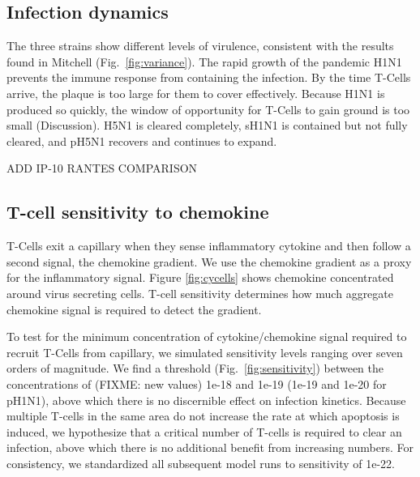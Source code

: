 \documentclass[10pt]{article}
\begin{document}
\subsection*{Infection dynamics}

The three strains show different levels of virulence, consistent with the results found in Mitchell (Fig.~\ref{fig:variance}).  The rapid growth of the pandemic H1N1 prevents the immune response from containing the infection.  By the time T-Cells arrive, the plaque is too large for them  to cover effectively.  Because H1N1 is produced so quickly, the window of opportunity for T-Cells to gain ground is too small (Discussion).  H5N1 is cleared completely, sH1N1 is contained but not fully cleared, and pH5N1 recovers and continues to expand.

ADD IP-10 RANTES COMPARISON

\subsection*{T-cell sensitivity to chemokine}

T-Cells exit a capillary when they sense inflammatory cytokine and then follow a second signal, the chemokine gradient.  We use the chemokine gradient as a proxy for the inflammatory signal.  Figure \ref{fig:cycells} shows chemokine concentrated around virus secreting cells.  T-cell sensitivity determines how much aggregate chemokine signal is required to detect the gradient.

To test for the minimum concentration of cytokine/chemokine signal required to recruit T-Cells from capillary, we simulated sensitivity levels ranging over seven orders of magnitude. We find a threshold (Fig.~\ref{fig:sensitivity}) between the concentrations of (FIXME: new values) 1e-18 and 1e-19 (1e-19 and 1e-20 for pH1N1), above which there is no discernible effect on infection kinetics.  Because multiple T-cells in the same area do not increase the rate at which  apoptosis is induced, we hypothesize that a critical number of T-cells is required to clear an infection, above which there is no additional benefit from increasing numbers.  For consistency, we standardized all subsequent model runs to  sensitivity of 1e-22.
\end{document}
